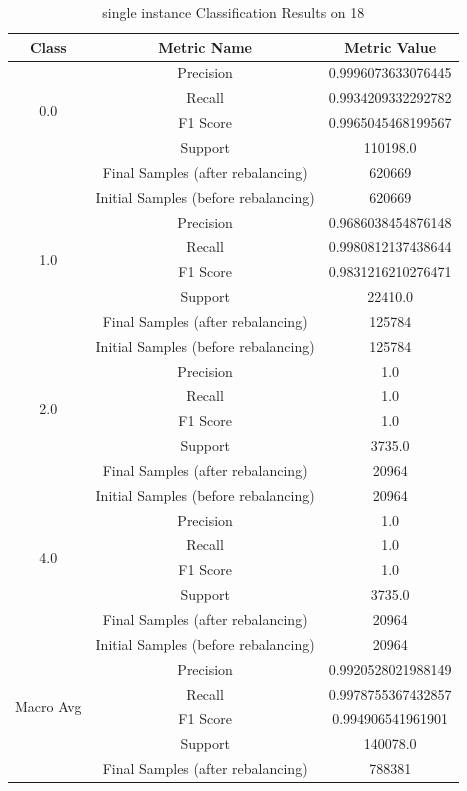 \begin{longtable}{|c|c|c|}
\caption{single instance Classification Results on 18} \label{tab:18_single_instance_classifiers_results} \\
\hline
Class & Metric Name & Metric Value \\
\hline
\multirow{4}{*}{0.0} & Precision & 0.9996073633076445 \\
 & Recall & 0.9934209332292782 \\
 & F1 Score & 0.9965045468199567 \\
 & Support & 110198.0 \\
 & Final Samples (after rebalancing) & 620669 \\
 & Initial Samples (before rebalancing) & 620669 \\
\hline
\multirow{4}{*}{1.0} & Precision & 0.9686038454876148 \\
 & Recall & 0.9980812137438644 \\
 & F1 Score & 0.9831216210276471 \\
 & Support & 22410.0 \\
 & Final Samples (after rebalancing) & 125784 \\
 & Initial Samples (before rebalancing) & 125784 \\
\hline
\multirow{4}{*}{2.0} & Precision & 1.0 \\
 & Recall & 1.0 \\
 & F1 Score & 1.0 \\
 & Support & 3735.0 \\
 & Final Samples (after rebalancing) & 20964 \\
 & Initial Samples (before rebalancing) & 20964 \\
\hline
\multirow{4}{*}{4.0} & Precision & 1.0 \\
 & Recall & 1.0 \\
 & F1 Score & 1.0 \\
 & Support & 3735.0 \\
 & Final Samples (after rebalancing) & 20964 \\
 & Initial Samples (before rebalancing) & 20964 \\
\hline
\multirow{4}{*}{Macro Avg} & Precision & 0.9920528021988149 \\
 & Recall & 0.9978755367432857 \\
 & F1 Score & 0.994906541961901 \\
 & Support & 140078.0 \\
 & Final Samples (after rebalancing) & 788381 \\

\end{longtable}
